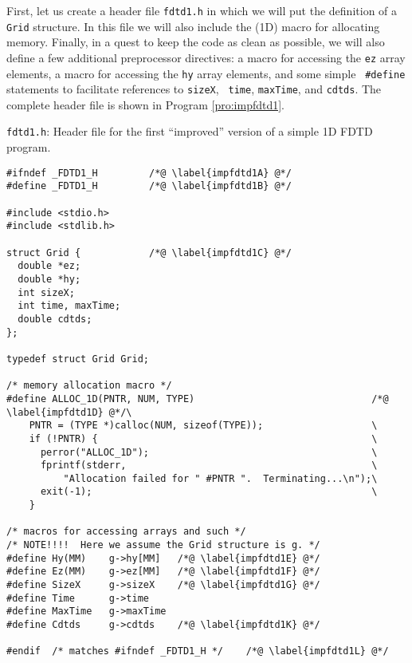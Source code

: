 First, let us create a header file {\tt fdtd1.h} in which we will put
the definition of a {\tt Grid} structure.  In this file we will also
include the (1D) macro for allocating memory.  Finally, in a quest to
keep the code as clean as possible, we will also define a few additional
preprocessor directives: a macro for accessing the {\tt ez} array elements,
a macro for accessing the {\tt hy} array elements, and some simple {\tt
  \#define} statements to facilitate references to {\tt sizeX}, {\tt
  time}, {\tt maxTime}, and {\tt cdtds}.  The complete header file is
shown in Program \ref{pro:impfdtd1}.

\begin{program}
{\tt fdtd1.h}: 
Header file for the first ``improved'' version of a simple 1D FDTD
program. \label{pro:impfdtd1}
\codemiddle
\begin{lstlisting}
#ifndef _FDTD1_H         /*@ \label{impfdtd1A} @*/
#define _FDTD1_H         /*@ \label{impfdtd1B} @*/

#include <stdio.h>
#include <stdlib.h>

struct Grid {            /*@ \label{impfdtd1C} @*/
  double *ez;
  double *hy;
  int sizeX;
  int time, maxTime;
  double cdtds;
};

typedef struct Grid Grid;

/* memory allocation macro */
#define ALLOC_1D(PNTR, NUM, TYPE)                               /*@ \label{impfdtd1D} @*/\
    PNTR = (TYPE *)calloc(NUM, sizeof(TYPE));                   \
    if (!PNTR) {                                                \
      perror("ALLOC_1D");                                       \
      fprintf(stderr,                                           \
          "Allocation failed for " #PNTR ".  Terminating...\n");\
      exit(-1);                                                 \
    }

/* macros for accessing arrays and such */
/* NOTE!!!!  Here we assume the Grid structure is g. */
#define Hy(MM)    g->hy[MM]   /*@ \label{impfdtd1E} @*/
#define Ez(MM)    g->ez[MM]   /*@ \label{impfdtd1F} @*/
#define SizeX     g->sizeX    /*@ \label{impfdtd1G} @*/
#define Time      g->time
#define MaxTime   g->maxTime
#define Cdtds     g->cdtds    /*@ \label{impfdtd1K} @*/

#endif  /* matches #ifndef _FDTD1_H */    /*@ \label{impfdtd1L} @*/
\end{lstlisting}
\end{program}

